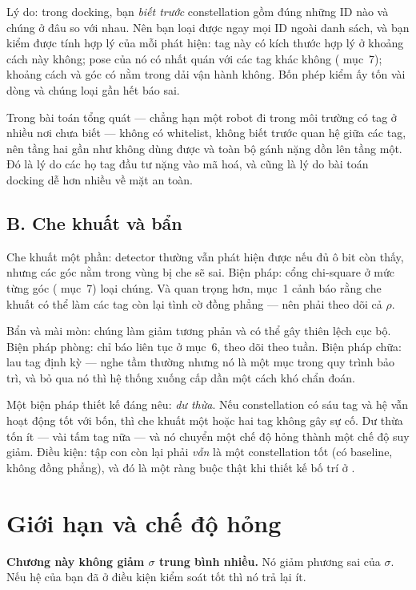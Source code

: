 \documentclass[../../marker.tex]{subfiles}
\begin{document}
Lý do: trong docking, bạn \emph{biết trước} constellation gồm đúng những ID nào và chúng ở đâu so với nhau. Nên bạn loại được ngay mọi ID ngoài danh sách, và bạn kiểm được tính hợp lý của mỗi phát hiện: tag này có kích thước hợp lý ở khoảng cách này không; pose của nó có nhất quán với các tag khác không ( mục~7); khoảng cách và góc có nằm trong dải vận hành không. Bốn phép kiểm ấy tốn vài dòng và chúng loại gần hết báo sai.

Trong bài toán tổng quát --- chẳng hạn một robot đi trong môi trường có tag ở nhiều nơi chưa biết --- không có whitelist, không biết trước quan hệ giữa các tag, nên tầng hai gần như không dùng được và toàn bộ gánh nặng dồn lên tầng một. Đó là lý do các họ tag đầu tư nặng vào mã hoá, và cũng là lý do bài toán docking dễ hơn nhiều về mặt an toàn.

\subsection{B. Che khuất và bẩn}

Che khuất một phần: detector thường vẫn phát hiện được nếu đủ ô bit còn thấy, nhưng các góc nằm trong vùng bị che sẽ sai. Biện pháp: cổng chi-square ở mức từng góc ( mục~7) loại chúng. Và quan trọng hơn,  mục~1 cảnh báo rằng che khuất có thể làm các tag còn lại tình cờ đồng phẳng --- nên phải theo dõi cả \(\rho\).

Bẩn và mài mòn: chúng làm giảm tương phản và có thể gây thiên lệch cục bộ. Biện pháp phòng: chỉ báo liên tục ở  mục~6, theo dõi theo tuần. Biện pháp chữa: lau tag định kỳ --- nghe tầm thường nhưng nó là một mục trong quy trình bảo trì, và bỏ qua nó thì hệ thống xuống cấp dần một cách khó chẩn đoán.

Một biện pháp thiết kế đáng nêu: \emph{dư thừa}. Nếu constellation có sáu tag và hệ vẫn hoạt động tốt với bốn, thì che khuất một hoặc hai tag không gây sự cố. Dư thừa tốn ít --- vài tấm tag nữa --- và nó chuyển một chế độ hỏng thành một chế độ suy giảm. Điều kiện: tập con còn lại phải \emph{vẫn} là một constellation tốt (có baseline, không đồng phẳng), và đó là một ràng buộc thật khi thiết kế bố trí ở .

\section{Giới hạn và chế độ hỏng}

\textbf{Chương này không giảm \(\sigma\) trung bình nhiều.} Nó giảm phương sai của \(\sigma\). Nếu hệ của bạn đã ở điều kiện kiểm soát tốt thì nó trả lại ít.
\end{document}
